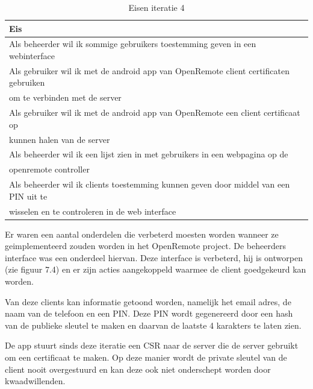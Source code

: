\documentclass{article}
\begin{document}
\begin{table}[h!]
  \caption{Eisen iteratie 4}
  \begin{center}
    \begin{tabular}{|| l ||}\hline
        Eis                                                                                   \\\hline\hline
        Als beheerder wil ik sommige gebruikers toestemming geven in een webinterface         \\\hline
        Als gebruiker wil ik met de android app van OpenRemote client certificaten gebruiken  \\ 
        om te verbinden met de server                                                         \\\hline
        Als gebruiker wil ik met de android app van OpenRemote een client certificaat op      \\ 
        kunnen halen van de server                                                            \\\hline
        Als beheerder wil ik een lijst zien in met gebruikers in een webpagina op de          \\
        openremote  controller                                                                \\\hline
        Als beheerder wil ik clients toestemming kunnen geven door middel van een PIN uit te  \\ 
        wisselen en te controleren in de web interface                                        \\\hline
    \end{tabular}
  \end{center}
\end{table}

Er waren een aantal onderdelen die verbeterd moesten worden wanneer ze
geimplementeerd zouden worden in het OpenRemote project. De beheerders
interface was een onderdeel hiervan. Deze interface is verbeterd, hij is
ontworpen (zie figuur 7.4) en er zijn acties aangekoppeld waarmee de client
goedgekeurd kan worden.

Van deze clients kan informatie getoond worden, namelijk het email adres,
de naam van de telefoon en een PIN. Deze PIN wordt gegenereerd door een
hash van de publieke sleutel te maken en daarvan de laatste 4 karakters te
laten zien.

De app stuurt sinds deze iteratie een CSR naar de server die de server
gebruikt om een certificaat te maken. Op deze manier wordt de private
sleutel van de client nooit overgestuurd en kan deze ook niet onderschept
worden door kwaadwillenden.
\end{document}
